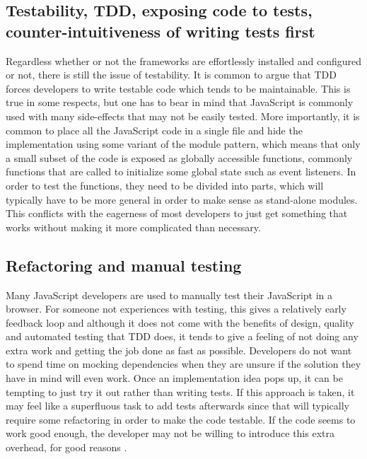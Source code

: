 \documentclass[11pt]{article}
\begin{document}
\subsection{Testability, TDD, exposing code to tests, counter-intuitiveness of writing tests first}

Regardless whether or not the frameworks are effortlessly installed and configured or not, there is still the issue of testability. It is common to argue that TDD forces developers to write testable code which tends to be maintainable. This is true in some respects, but one has to bear in mind that JavaScript is commonly used with many side-effects that may not be easily tested. More importantly, it is common to place all the JavaScript code in a single file and hide the implementation using some variant of the module pattern\cite[p.~40]{GoodParts}, which means that only a small subset of the code is exposed as globally accessible functions, commonly functions that are called to initialize some global state such as event listeners. In order to test the functions, they need to be divided into parts, which will typically have to be more general in order to make sense as stand-alone modules. This conflicts with the eagerness of most developers to just get something that works without making it more complicated than necessary.

\subsection{Refactoring and manual testing}

Many JavaScript developers are used to manually test their JavaScript in a browser. For someone not experiences with testing, this gives a relatively early feedback loop and although it does not come with the benefits of design, quality and automated testing that TDD does, it tends to give a feeling of not doing any extra work and getting the job done as fast as possible. Developers do not want to spend time on mocking dependencies when they are unsure if the solution they have in mind will even work. Once an implementation idea pops up, it can be tempting to just try it out rather than writing tests. If this approach is taken, it may feel like a superfluous task to add tests afterwards since that will typically require some refactoring in order to make the code testable. If the code seems to work good enough, the developer may not be willing to introduce this extra overhead, for good reasons \cite[question~43]{Stenmark}.
\end{document}
